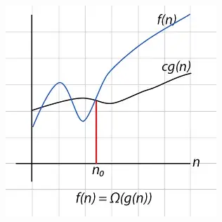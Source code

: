 \documentclass[10pt,aspectratio=43]{beamer}
\begin{document}
\begin{frame}
\begin{columns}
    \begin{column}{0.3\textwidth}
      \includegraphics[width=\textwidth]{figures/MasterTheorem/omega.jpg}
    \end{column}
  \end{columns}
\end{frame}
\end{document}
